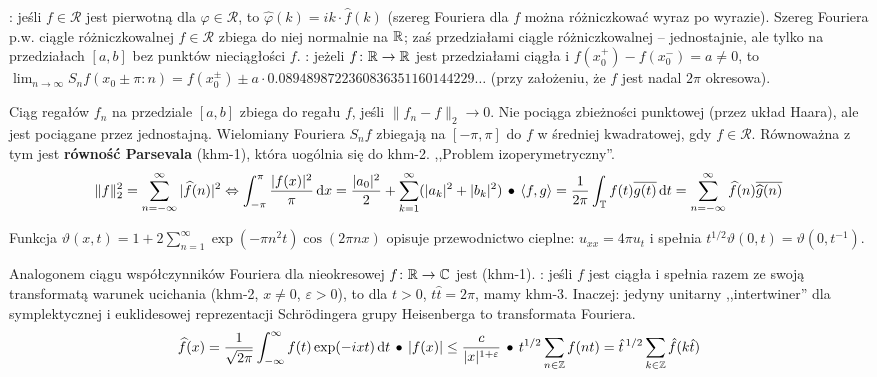 :  jeśli $f \in \mathcal R$ jest pierwotną dla $\varphi \in \mathcal R$, to $\widehat \varphi(k) = ik \cdot \widehat f(k)$ (szereg Fouriera dla $f$ można różniczkować wyraz po wyrazie).
Szereg Fouriera p.w. ciągle różniczkowalnej $f \in \mathcal R$ zbiega do niej normalnie na $\mathbb{R}$; zaś przedziałami ciągle różniczkowalnej -- jednostajnie, ale tylko na przedziałach $[a,b]$ bez punktów nieciągłości $f$.
: jeżeli $f \colon \mathbb{R} \to \mathbb{R}$ jest przedziałami ciągła i $f(x^+_0) - f(x_0^-) = a \neq 0$, to $\lim_{n \to \infty} S_n f(x_0 \pm \pi : n) = f(x_0^\pm) \pm a \cdot 0.0894898722360836351160144229	 \ldots$ (przy założeniu, że $f$ jest nadal $2\pi$ okresowa).

Ciąg  regałów  $f_n$ na przedziale $[a,b]$ zbiega  do regału $f$, jeśli $\|f_n - f\|_2 \to 0$.
Nie pociąga zbieżności punktowej (przez układ Haara), ale jest pociągane przez jednostajną.
Wielomiany Fouriera $S_nf$ zbiegają na $[-\pi, \pi]$ do $f$ w średniej kwadratowej, gdy $f \in \mathcal R$.
Równoważna z tym jest \textbf{równość Parsevala} (khm-1), która uogólnia się do khm-2.
,,Problem izoperymetryczny''.
\[
	\|f\|_2^2 = \sum_{n = -\infty}^\infty |\widehat f(n)|^2 \Leftrightarrow \int_{-\pi}^\pi \frac{|f(x)|^2}{\pi} \,\textrm{d}x = \frac{|a_0|^2}{2} + \sum_{k=1}^\infty (|a_k|^2 + |b_k|^2) \, \bullet \,
	\langle f,g\rangle = \frac{1}{2\pi} \int_{\mathbb T} f(t) \overline{g(t)} \,\textrm{d}t = \sum_{n = -\infty}^\infty \widehat f (n) \overline{\widehat g(n)}
\]

Funkcja  $\vartheta(x, t) = 1 + 2 \sum_{n = 1}^\infty \exp (- \pi n^2 t) \cos (2 \pi n x)$ opisuje przewodnictwo cieplne: $u_{xx} = 4 \pi u_t$ i spełnia $t^{1/2} \vartheta(0, t) = \vartheta(0, t^{-1})$.

Analogonem  ciągu współczynników Fouriera dla nieokresowej $f \colon \mathbb{R} \to \mathbb{C}$ jest  (khm-1).
: jeśli $f$ jest ciągła i spełnia razem ze swoją transformatą warunek ucichania (khm-2, $x \neq 0$, $\varepsilon > 0$), to dla $t > 0$, $t \widehat t = 2\pi$, mamy khm-3.
Inaczej: jedyny unitarny ,,intertwiner'' dla symplektycznej i euklidesowej reprezentacji Schrödingera grupy Heisenberga to transformata Fouriera.
\[
	\widehat{f}(x) = \frac{1}{\sqrt{2\pi}} \int_{-\infty}^\infty f(t) \exp(-ixt) \,\textrm{d}t \, \bullet \,
	|f(x)| \le \frac{c}{|x|^{1+\varepsilon}} \, \bullet \,
	t^{1/2} \sum_{n \in \mathbb{Z}} f(nt) = \hat{t}^{\,1/2} \sum_{k \in \mathbb{Z}} \hat f(k \hat t)
\]